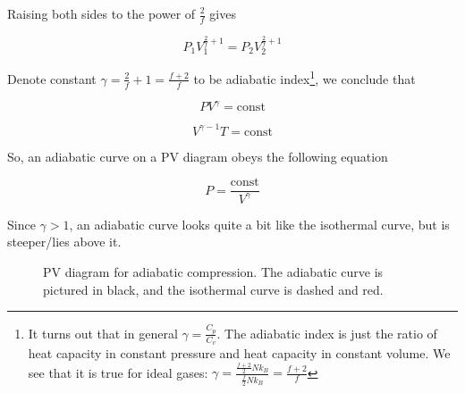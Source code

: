\documentclass[12pt, a4paper]{article}
\begin{document}
Raising both sides to the power of $\frac{2}{f}$ gives

\[P_1 V_1^{\frac{2}{f}+1}=P_2 V_2^{\frac{2}{f}+1}\]

Denote constant $\gamma=\frac{2}{f}+1=\frac{f+2}{f}$ to be adiabatic index\footnote{It turns out that in general $\gamma=\frac{C_p}{C_v}$. The adiabatic index is just the ratio of heat capacity in constant pressure and heat capacity in constant volume. We see that it is true for ideal gases: $\gamma=\frac{\frac{f+2}{2}Nk_B}{\frac{f}{2}Nk_B}=\frac{f+2}{f}$}, we conclude that

\[PV^\gamma=\text{const}\]

\[V^{\gamma-1}T=\text{const}\]

So, an adiabatic curve on a PV diagram obeys the following equation

\[P=\frac{\text{const}}{V^\gamma}\]

Since $\gamma>1$, an adiabatic curve looks quite a bit like the isothermal curve, but is steeper/lies above it.

\begin{figure}[H]
\centering
{}
\caption{PV diagram for adiabatic compression. The adiabatic curve is pictured in black, and the isothermal curve is dashed and red.}
\end{figure}
\end{document}
